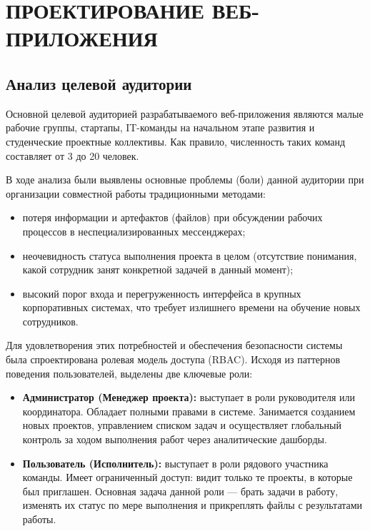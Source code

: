 \section{ПРОЕКТИРОВАНИЕ ВЕБ-ПРИЛОЖЕНИЯ}

\subsection{Анализ целевой аудитории}

Основной целевой аудиторией разрабатываемого веб-приложения являются малые рабочие группы, стартапы, IT-команды на начальном этапе развития и студенческие проектные коллективы. Как правило, численность таких команд составляет от 3 до 20 человек.

В ходе анализа были выявлены основные проблемы (боли) данной аудитории при организации совместной работы традиционными методами:
\begin{itemize}
    \item потеря информации и артефактов (файлов) при обсуждении рабочих процессов в неспециализированных мессенджерах;
    \item неочевидность статуса выполнения проекта в целом (отсутствие понимания, какой сотрудник занят конкретной задачей в данный момент);
    \item высокий порог входа и перегруженность интерфейса в крупных корпоративных системах, что требует излишнего времени на обучение новых сотрудников.
\end{itemize}

Для удовлетворения этих потребностей и обеспечения безопасности системы была спроектирована ролевая модель доступа (RBAC). Исходя из паттернов поведения пользователей, выделены две ключевые роли:
\begin{itemize}
    \item \textbf{Администратор (Менеджер проекта):} выступает в роли руководителя или координатора. Обладает полными правами в системе. Занимается созданием новых проектов, управлением списком задач и осуществляет глобальный контроль за ходом выполнения работ через аналитические дашборды.
    \item \textbf{Пользователь (Исполнитель):} выступает в роли рядового участника команды. Имеет ограниченный доступ: видит только те проекты, в которые был приглашен. Основная задача данной роли — брать задачи в работу, изменять их статус по мере выполнения и прикреплять файлы с результатами работы.
\end{itemize}

